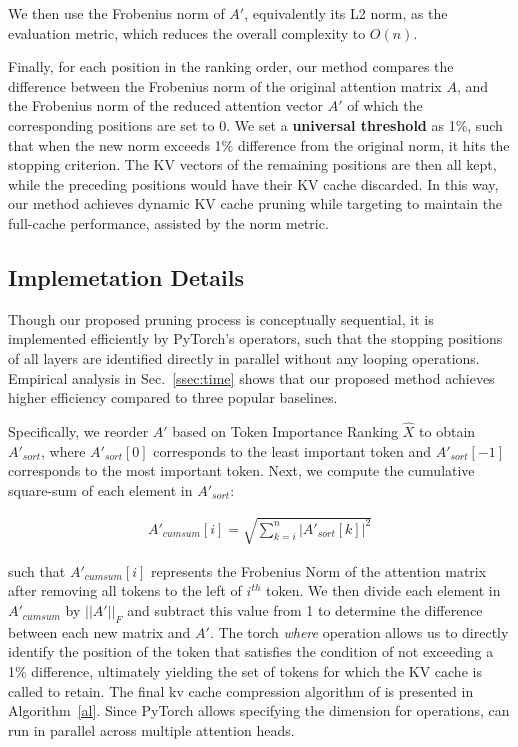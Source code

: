 We then use the Frobenius norm of $A'$, equivalently its L2 norm, as the evaluation metric, which reduces the overall complexity to $O(n)$.

Finally, for each position in the ranking order, our method compares the difference between the Frobenius norm of the original attention matrix $A$, and the Frobenius norm of the reduced attention vector $A'$ of which the corresponding positions are set to $0$. We set a \textbf{universal threshold} as 1\%, such that when the new norm exceeds 1\% difference from the original norm, it hits the stopping criterion. The KV vectors of the remaining positions are then all kept, while the preceding positions would have their KV cache discarded. In this way, our method achieves dynamic KV cache pruning while targeting to maintain the full-cache performance, assisted by the norm metric.

\subsection{Implemetation Details}
\label{ssec:impl}

Though our proposed pruning process is conceptually sequential, it is implemented efficiently by PyTorch's operators, such that the stopping positions of all layers are identified directly in parallel without any looping operations. Empirical analysis in Sec.~\ref{ssec:time} shows that our proposed method achieves higher efficiency compared to three popular baselines.

Specifically, we reorder $A'$ based on Token Importance Ranking $\widehat{X}$ to obtain $A'_{sort}$, where $A'_{sort}[0]$ corresponds to the least important token and $A'_{sort}[-1]$ corresponds to the most important token. Next, we compute the cumulative square-sum of each element in $A'_{sort}$:

\begin{align}
A'_{cumsum}[i] = \sqrt{\sum_{k=i}^{n} |A'_{sort}[k]|^2}
\end{align}

such that $A'_{cumsum}[i]$ represents the Frobenius Norm of the attention matrix after removing all tokens to the left of $i^{th}$ token. We then divide each element in 
$A'_{cumsum}$ by $||A'||_F$ and subtract this value from 1 to determine the difference between each new matrix and $A'$. The torch \emph{where} operation allows us to directly identify the position of the token that satisfies the condition of not exceeding a 1\% difference, ultimately yielding the set of tokens for which the KV cache is called to retain. The final kv cache compression algorithm of \method is presented in Algorithm~\ref{al}. Since PyTorch allows specifying the dimension for operations, \method can run in parallel across multiple attention heads.

